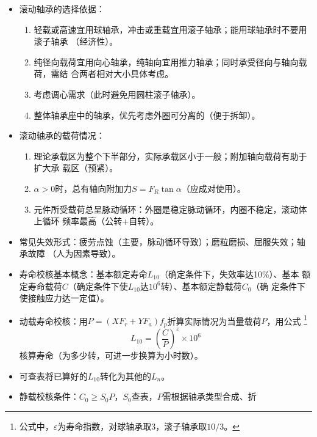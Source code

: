 \documentclass[12pt,a4paper]{article}
\newcommand{\tightlist}{\setlength{\parskip}{0pt}\setlength{\itemsep}{0pt}}
\newcommand{\hint}[1]{\textsf{（#1）}}
\newcommand{\minor}[1]{{\color{gray} #1}}
\begin{document}
\begin{itemize}
\begin{itemize}
{        应标出``/Pn''}。
        \item 游隙代号：\minor{系列为$120345$}，一般为$0$并省略\minor{，否则应标出
        ``/Cn''}。
    \end{itemize}
    \item 滚动轴承的选择依据：
    \begin{enumerate}\tightlist
        \item 轻载或高速宜用球轴承，冲击或重载宜用滚子轴承；能用球轴承时不要用滚子轴承
        \hint{经济性}。
        \item 纯径向载荷宜用向心轴承，纯轴向宜用推力轴承；同时承受径向与轴向载荷，需结
        合两者相对大小具体考虑。
        \item 考虑调心需求\hint{此时避免用圆柱滚子轴承}。
        \item 整体轴承座中的轴承，优先考虑外圈可分离的\hint{便于拆卸}。
    \end{enumerate}
    \item 滚动轴承的载荷情况：
    \begin{enumerate}\tightlist
        \item 理论承载区为整个下半部分，实际承载区小于一般；附加轴向载荷有助于扩大承
        载区\hint{预紧}。
        \item $\alpha>0$时，总有轴向附加力$S=F_R\tan\alpha$\hint{应成对使用}。
        \item 元件所受载荷总呈脉动循环：外圈是稳定脉动循环，内圈不稳定，滚动体上循环
        频率最高\hint{公转+自转}。
    \end{enumerate}
    \item 常见失效形式：疲劳点蚀\hint{主要，脉动循环导致}；磨粒磨损、屈服失效；轴承故障
    \hint{人为因素导致}。
    \item 寿命校核基本概念：基本额定寿命$L_{10}$\hint{确定条件下，失效率达10\%}、基本
    额定寿命载荷$C$\hint{确定条件下使$L_{10}$达$10^6$转}、基本额定静载荷$C_0$\hint{确
    定条件下使接触应力达一定值}。
    \item 动载寿命校核：用$P=(XF_r+YF_a)f_p$折算实际情况为当量载荷$P$，用公式
    \footnote{公式中，$\varepsilon$为寿命指数，对球轴承取$3$，滚子轴承取$10/3$。}
    \begin{equation}
        L_{10}=\left(\frac CP\right)^\varepsilon\times10^6
    \end{equation}
    核算寿命\hint{为多少转，可进一步换算为小时数}。
    \item \minor{可查表将已算好的$L_{10}$转化为其他的$L_n$。}
    \item \minor{静载校核条件：$C_0\geq S_0P$，$S_0$查表，$P$需根据轴承类型合成、折
}
\end{itemize}
\end{document}
